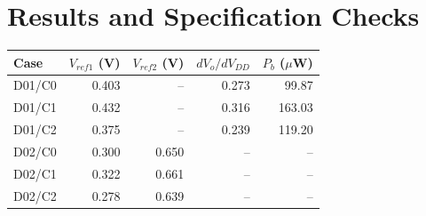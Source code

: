 \section{Results and Specification Checks}
\begin{center}\small\begin{tabular}{lrrrr}\toprule
Case & $V_{ref1}$ (V) & $V_{ref2}$ (V) & $dV_o/dV_{DD}$ & $P_b$ ($\mu$W) \\ \midrule
D01/C0 & 0.403 & -- & 0.273 & 99.87 \\
D01/C1 & 0.432 & -- & 0.316 & 163.03 \\
D01/C2 & 0.375 & -- & 0.239 & 119.20 \\
D02/C0 & 0.300 & 0.650 & -- & -- \\
D02/C1 & 0.322 & 0.661 & -- & -- \\
D02/C2 & 0.278 & 0.639 & -- & -- \\
\bottomrule\end{tabular}\end{center}

